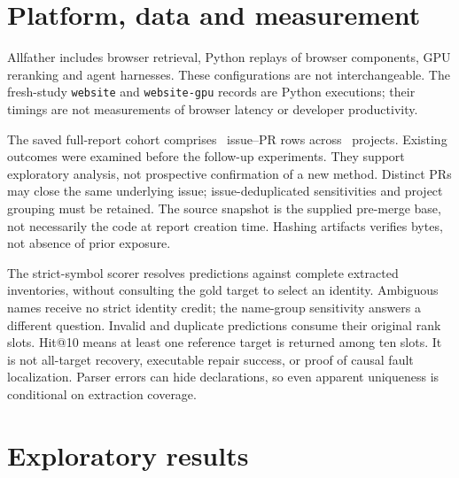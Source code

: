 \documentclass[11pt]{article}
\begin{document}
\section{Platform, data and measurement}
Allfather includes browser retrieval, Python replays of browser components, GPU reranking
and agent harnesses. These configurations are not interchangeable. The fresh-study
\texttt{website} and \texttt{website-gpu} records are Python executions; their timings are
not measurements of browser latency or developer productivity.

The saved full-report cohort comprises \FullIssues\ issue--PR rows across \FullProjects\
projects. Existing outcomes were examined before the follow-up experiments. They support
exploratory analysis, not prospective confirmation of a new method. Distinct PRs may close
the same underlying issue; issue-deduplicated sensitivities and project grouping must be
retained. The source snapshot is the supplied pre-merge base, not necessarily the code at
report creation time. Hashing artifacts verifies bytes, not absence of prior exposure.

The strict-symbol scorer resolves predictions against complete extracted inventories,
without consulting the gold target to select an identity. Ambiguous names receive no
strict identity credit; the name-group sensitivity answers a different question. Invalid
and duplicate predictions consume their original rank slots. Hit@10 means at least one
reference target is returned among ten slots. It is not all-target recovery, executable
repair success, or proof of causal fault localization. Parser errors can hide declarations,
so even apparent uniqueness is conditional on extraction coverage.

\section{Exploratory results}
\end{document}
